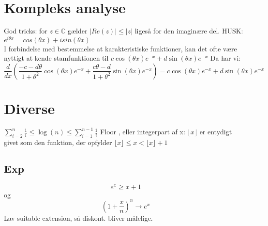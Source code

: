 \section*{Kompleks analyse}
God tricks:
for $z \in \mathbb{C}$ gælder $|Re(z)|\leq |z|$  ligeså for den imaginære del.\newline
HUSK: $e^{i\theta x} = cos(\theta x) + isin(\theta x)$\\
I forbindelse med bestemmelse at karakteristiske funktioner, kan det ofte være nyttigt at kende stamfunktionen til $c \cos(\theta x)e^{-x} + d\sin(\theta x ) e^{-x}$ Da har vi:
$$\frac{d}{dx} \left( \frac{-c-d\theta}{1+\theta^2} \cos(\theta x) e^{-x} + \frac{c\theta -d}{1+\theta^2}\sin(\theta x)e^{-x}\right) = c\cos(\theta x) e^{-x} + d \sin(\theta x) e^{-x} $$

\newpage
\section{Diverse}
$\sum\limits_{i=2}^n\frac{1}{i} \leq \log(n) \leq \sum\limits_{i=1}^{n-1}\frac{1}{i}$\newline
Floor , eller integerpart af x:
$\lfloor x \rfloor $ er entydigt givet som den funktion, der opfylder $\lfloor x \rfloor\leq x < \lfloor x \rfloor +1 $
\subsection*{Exp}
$$ e^x \geq x+1 $$
og
$$\left(1+\frac{x}{n}\right)^n \rightarrow e^x $$
Lav suitable extension, så diskont. bliver målelige.



